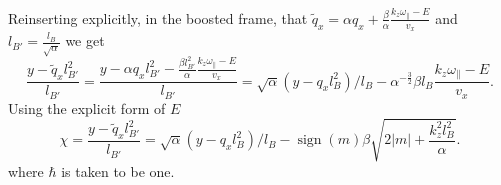 Reinserting explicitly, in the boosted frame, that \(\tilde{q}_{x} = \alpha q_{x} + \frac{\beta}{\alpha } \frac{k_{z} \omega _{\parallel} - E}{v_{x}} \) and \(l_{B'}=\frac{l_{B}}{\sqrt{\alpha} }\)
we get
\begin{equation}
  \label{eq:41}
  \frac{y-\tilde{q}_{x} l_{B'}^2}{l_{B'}}
  =
  \frac{y - \alpha q_{x} l_{B'}^2 - \frac{\beta l_{B'}^2}{\alpha } \frac{k_{z} \omega _{\parallel} - E}{v_{x}}}{l_{B'}}
  =
  \sqrt{\alpha } (y-q_{x} l_{B}^2) /l_{B} - \alpha^{-\frac{3}{2}}  \beta l_{B} \frac{k_{z} \omega _{\parallel} - E}{v_{x}}.
\end{equation}
Using the explicit form of \(E\)
\begin{equation}
  \label{eq:43}
  \chi =
  \frac{y-\tilde{q}_{x} l_{B'}^2}{l_{B'}}
  =
  \sqrt{\alpha } (y-q_{x} l_{B}^2) /l_{B}
  - \operatorname{sign}(m)
  \beta
  \sqrt{2 |m| + \frac{k_{z}^2 l_{B}^2}{\alpha }}.
\end{equation}
where \(\hbar \) is taken to be one.


